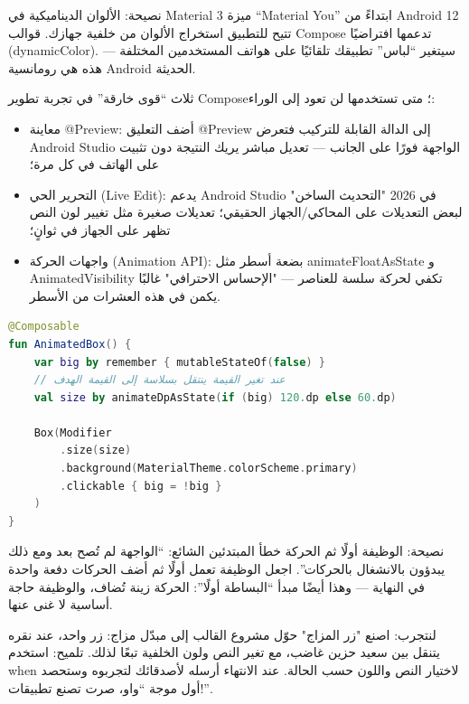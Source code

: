 \begin{tcbinfo}{نصيحة: الألوان الديناميكية في Material 3}
ميزة “Material You” ابتداءً من Android 12 تتيح للتطبيق استخراج الألوان من خلفية جهازك. قوالب Compose تدعمها افتراضيًا (dynamicColor). سيتغير “لباس” تطبيقك تلقائيًا على هواتف المستخدمين المختلفة — هذه هي رومانسية Android الحديثة.

\end{tcbinfo}


ثلاث “قوى خارقة” في تجربة تطوير Compose؛ متى تستخدمها لن تعود إلى الوراء:

\begin{itemize}
  \item معاينة @Preview: أضف التعليق @Preview إلى الدالة القابلة للتركيب فتعرض Android Studio الواجهة فورًا على الجانب — تعديل مباشر يريك النتيجة دون تثبيت على الهاتف في كل مرة؛
  \item التحرير الحي (Live Edit): يدعم Android Studio في 2026 "التحديث الساخن" لبعض التعديلات على المحاكي/الجهاز الحقيقي؛ تعديلات صغيرة مثل تغيير لون النص تظهر على الجهاز في ثوانٍ؛
  \item واجهات الحركة (Animation API): بضعة أسطر مثل animateFloatAsState و AnimatedVisibility تكفي لحركة سلسة للعناصر — "الإحساس الاحترافي" غالبًا يكمن في هذه العشرات من الأسطر.
\end{itemize}

\begin{lstlisting}[language=Kotlin]
@Composable
fun AnimatedBox() {
    var big by remember { mutableStateOf(false) }
    // عند تغير القيمة ينتقل بسلاسة إلى القيمة الهدف
    val size by animateDpAsState(if (big) 120.dp else 60.dp)

    Box(Modifier
        .size(size)
        .background(MaterialTheme.colorScheme.primary)
        .clickable { big = !big }
    )
}
\end{lstlisting}

\begin{tcbinfo}{نصيحة: الوظيفة أولًا ثم الحركة}
خطأ المبتدئين الشائع: “الواجهة لم تُصح بعد ومع ذلك يبدؤون بالانشغال بالحركات”. اجعل الوظيفة تعمل أولًا ثم أضف الحركات دفعة واحدة في النهاية — وهذا أيضًا مبدأ “البساطة أولًا”: الحركة زينة تُضاف، والوظيفة حاجة أساسية لا غنى عنها.

\end{tcbinfo}

\begin{tcbpractice}{لنتجرب: اصنع "زر المزاج"}
حوّل مشروع القالب إلى مبدّل مزاج: زر واحد، عند نقره يتنقل بين سعيد حزين غاضب، مع تغير النص ولون الخلفية تبعًا لذلك. تلميح: استخدم when لاختيار النص واللون حسب الحالة. عند الانتهاء أرسله لأصدقائك لتجربوه وستحصد أول موجة “واو، صرت تصنع تطبيقات!”.

\end{tcbpractice}

